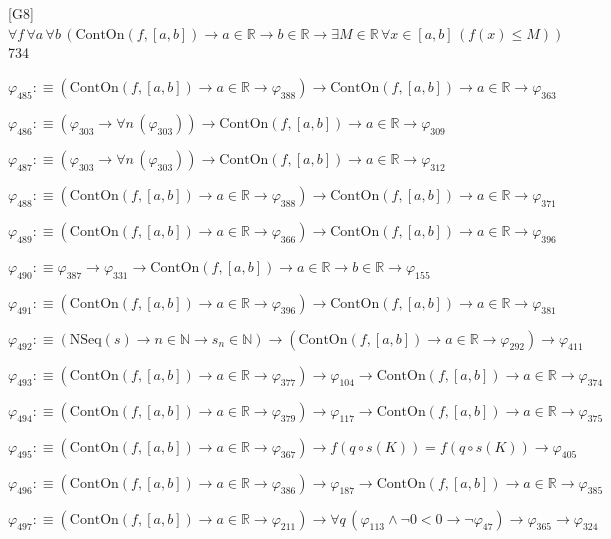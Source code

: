 \begin{fullproof}{[G8]}{$\forall f\,\forall a\,\forall b\,(\mathrm{ContOn}(f,[a,b]) \to a \in \mathbb{R} \to b \in \mathbb{R} \to \exists M \in \mathbb{R}\,\forall x \in [a,b]\,(f(x) \leq M))$}{734}
\begin{abbrevlist}
\item $\varphi_{485} :\equiv (\mathrm{ContOn}(f,[a,b]) \to a \in \mathbb{R} \to \varphi_{388}) \to \mathrm{ContOn}(f,[a,b]) \to a \in \mathbb{R} \to \varphi_{363}$
\item $\varphi_{486} :\equiv (\varphi_{303} \to \forall n\,(\varphi_{303})) \to \mathrm{ContOn}(f,[a,b]) \to a \in \mathbb{R} \to \varphi_{309}$
\item $\varphi_{487} :\equiv (\varphi_{303} \to \forall n\,(\varphi_{303})) \to \mathrm{ContOn}(f,[a,b]) \to a \in \mathbb{R} \to \varphi_{312}$
\item $\varphi_{488} :\equiv (\mathrm{ContOn}(f,[a,b]) \to a \in \mathbb{R} \to \varphi_{388}) \to \mathrm{ContOn}(f,[a,b]) \to a \in \mathbb{R} \to \varphi_{371}$
\item $\varphi_{489} :\equiv (\mathrm{ContOn}(f,[a,b]) \to a \in \mathbb{R} \to \varphi_{366}) \to \mathrm{ContOn}(f,[a,b]) \to a \in \mathbb{R} \to \varphi_{396}$
\item $\varphi_{490} :\equiv \varphi_{387} \to \varphi_{331} \to \mathrm{ContOn}(f,[a,b]) \to a \in \mathbb{R} \to b \in \mathbb{R} \to \varphi_{155}$
\item $\varphi_{491} :\equiv (\mathrm{ContOn}(f,[a,b]) \to a \in \mathbb{R} \to \varphi_{396}) \to \mathrm{ContOn}(f,[a,b]) \to a \in \mathbb{R} \to \varphi_{381}$
\item $\varphi_{492} :\equiv (\mathrm{NSeq}(s) \to n \in \mathbb{N} \to s_{n} \in \mathbb{N}) \to (\mathrm{ContOn}(f,[a,b]) \to a \in \mathbb{R} \to \varphi_{292}) \to \varphi_{411}$
\item $\varphi_{493} :\equiv (\mathrm{ContOn}(f,[a,b]) \to a \in \mathbb{R} \to \varphi_{377}) \to \varphi_{104} \to \mathrm{ContOn}(f,[a,b]) \to a \in \mathbb{R} \to \varphi_{374}$
\item $\varphi_{494} :\equiv (\mathrm{ContOn}(f,[a,b]) \to a \in \mathbb{R} \to \varphi_{379}) \to \varphi_{117} \to \mathrm{ContOn}(f,[a,b]) \to a \in \mathbb{R} \to \varphi_{375}$
\item $\varphi_{495} :\equiv (\mathrm{ContOn}(f,[a,b]) \to a \in \mathbb{R} \to \varphi_{367}) \to f(q \circ s(K)) = f(q \circ s(K)) \to \varphi_{405}$
\item $\varphi_{496} :\equiv (\mathrm{ContOn}(f,[a,b]) \to a \in \mathbb{R} \to \varphi_{386}) \to \varphi_{187} \to \mathrm{ContOn}(f,[a,b]) \to a \in \mathbb{R} \to \varphi_{385}$
\item $\varphi_{497} :\equiv (\mathrm{ContOn}(f,[a,b]) \to a \in \mathbb{R} \to \varphi_{211}) \to \forall q\,(\varphi_{113} \land \neg 0 < 0 \to \neg \varphi_{47}) \to \varphi_{365} \to \varphi_{324}$

\end{abbrevlist}
\end{fullproof}
